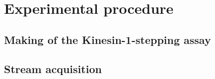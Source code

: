 \section{Experimental procedure}
\subsection{Making of the Kinesin-1-stepping assay}

\subsection{Stream acquisition}
        
